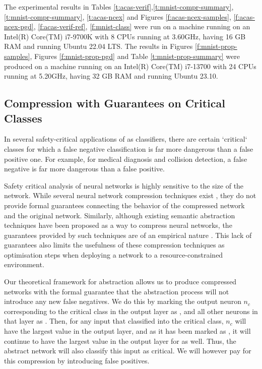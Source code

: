 The experimental results in Tables
\ref{t:acas-verif},\ref{t:mnist-compr-summary}, \ref{t:mnist-compr-summary},
\ref{t:acas-ncex} and Figures \ref{f:acas-ncex-samples},
\ref{f:acas-ncex-pgd}, \ref{f:acas-verif-ref},
\ref{f:mnist-class} were
run on a machine running on an Intel(R) Core(TM) i7-9700K with 8 CPUs running at
3.60GHz, having 16 GB RAM and running Ubuntu 22.04 LTS. The results in
Figures \ref{f:mnist-prop-samples}, Figures \ref{f:mnist-prop-pgd} and Table
\ref{t:mnist-prop-summary} were produced on a 
machine running on an Intel(R) Core(TM) i7-13700 with 24 CPUs running at
5.20GHz, having 32 GB RAM and running Ubuntu 23.10.

\subsection{Compression with Guarantees on Critical Classes}
\label{s:exp-mnist-comp}

In several safety-critical applications of \dnn as classifiers, there are
certain `critical` classes for which a false negative classification is far more
dangerous than a false positive one. For example, for medical diagnosis and
collision detection, a false negative is far more dangerous than a false
positive.

Safety critical analysis of neural networks is highly sensitive to the size of
the network. While several neural network compression techniques exist 
\cite{dnn-compression}, they do not provide formal guarantees 
connecting the behavior of the compressed network and the original network.
Similarly, although existing semantic abstraction techniques have been proposed
as a way to compress neural networks, the guarantees provided by such 
techniques are of an empirical nature \cite{lin-comb-abs-jan}.
This lack of guarantees also limits the usefulness of these compression
techniques as optimisation steps when deploying a network to a
resource-constrained environment. 

Our theoretical framework for abstraction allows us to produce compressed
networks with the formal guarantee that the abstraction process will not
introduce any new false negatives. We do this by marking the output neuron $n_c$
corresponding to the critical class in the output layer as \inc, and all other
neurons in that layer as \dec.  Then, for any input that \cnc classified into
the critical class, $n_c$ will have the largest value in the
output layer, and as it has been marked as \inc, it will continue to have the
largest value in the output layer for \abs as well. Thus, the
abstract network will also classify this input as critical. We will however pay
for this compression by introducing false positives.

